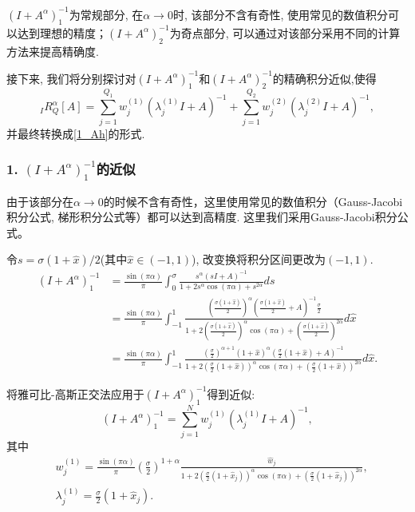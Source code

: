 \((I+A^{\alpha})_1^{-1}\)为常规部分, 在\(\alpha \rightarrow 0\)时, 该部分不含有奇性, 使用常见的数值积分可以达到理想的精度；\((I+A^{\alpha})_2^{-1}\)为奇点部分, 可以通过对该部分采用不同的计算方法来提高精确度. 

接下来, 我们将分别探讨对\((I+A^{\alpha})_1^{-1}\)和\((I+A^{\alpha})_2^{-1}\)的精确积分近似,使得
\begin{equation}\label{key}
	_IR_Q^{\alpha}[ A]=\sum_{j=1}^{Q_1}w^{(1)}_j(\lambda^{(1)}_jI+A)^{-1}+\sum_{j=1}^{Q_2}w^{(2)}_j(\lambda^{(2)}_jI+A)^{-1},
\end{equation}
并最终转换成\eqref{1_Ah}的形式.


\subsubsection{ 1. $(I+A^{\alpha})^{-1}_1$的近似}
由于该部分在\(\alpha\rightarrow 0\)的时候不含有奇性，这里使用常见的数值积分（Gauss-Jacobi积分公式, 梯形积分公式等）都可以达到高精度. 这里我们采用Gauss-Jacobi积分公式。

令$s=\sigma(1+\hat{x})/2$(其中$\hat{x}\in (-1,1)$), 改变换将积分区间更改为$(-1, 1)$. 
\begin{equation}
	\begin{aligned}
		(I+A^{\alpha})^{-1}_1&=\frac{\sin(\pi \alpha)}{\pi}\int_0^{\sigma}\frac{s^{\alpha}(s{I}+{A})^{-1}}{1+2s^{\alpha}\cos(\pi\alpha)+s^{2\alpha}}ds\\
		&=\frac{\sin(\pi \alpha)}{\pi}\int_{-1}^{1}\frac{\left(\frac{\sigma(1+\hat{x})}{2}\right)^{\alpha}\left(\frac{\sigma(1+\hat{x})}{2}+{A}\right)^{-1}\frac{\sigma}{2}}{1+2\left(\frac{\sigma(1+\hat{x})}{2}\right)^{\alpha}\cos(\pi\alpha)+\left(\frac{\sigma(1+\hat{x})}{2}\right)^{2\alpha}}d\hat{x}\\
		&=\frac{\sin(\pi \alpha)}{\pi}\int_{-1}^{1}\frac{\left(\frac{\sigma}{2}\right)^{\alpha+1}(1+\hat{x})^{\alpha}\left(\frac{\sigma}{2}(1+\hat{x})+{A}\right)^{-1}}{1+2\left(\frac{\sigma}{2}(1+\hat{x})\right)^{\alpha}\cos(\pi\alpha)+\left(\frac{\sigma}{2}(1+\hat{x})\right)^{2\alpha}}d\hat{x}.
	\end{aligned}
	\label{SE0_q1}
\end{equation}

将雅可比-高斯正交法应用于$(I+A^{\alpha})^{-1}_1$得到近似:
\begin{equation}
	(I+A^{\alpha})^{-1}_1 =\sum_{j=1}^{N}w^{(1)}_j(\lambda^{(1)}_jI+A)^{-1},
	\label{SE0_q1}
\end{equation}
其中
\begin{equation}
	\begin{aligned}
		& w_j^{(1)}=\frac{\sin(\pi\alpha)}{\pi}(\frac{\sigma}{2})^{1+\alpha}\frac{\hat{w}_j}{1+2\left(\frac{\sigma}{2}(1+\hat{x}_j)\right)^{\alpha}\cos(\pi\alpha)+\left(\frac{\sigma}{2}(1+\hat{x}_j)\right)^{2\alpha}}, \\
		& \lambda_j^{(1)}=\frac{\sigma}{2}(1+\hat{x}_j). 
	\end{aligned}
	\label{lw_SE0_q1}
\end{equation}


